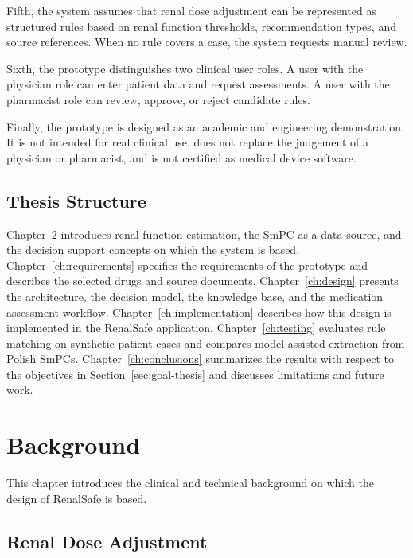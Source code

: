\documentclass[12pt,a4paper,twoside]{book}
\begin{document}
Fifth, the system assumes that renal dose adjustment can be represented as structured rules based on renal function thresholds, recommendation types, and source references.
When no rule covers a case, the system requests manual review.

Sixth, the prototype distinguishes two clinical user roles.
A user with the physician role can enter patient data and request assessments.
A user with the pharmacist role can review, approve, or reject candidate rules.

Finally, the prototype is designed as an academic and engineering demonstration.
It is not intended for real clinical use, does not replace the judgement of a physician or pharmacist, and is not certified as medical device software.

\section{Thesis Structure}\label{sec:thesis-structure}

Chapter~\ref{ch:background} introduces renal function estimation, the SmPC as a data source, and the decision support concepts on which the system is based.
Chapter~\ref{ch:requirements} specifies the requirements of the prototype and describes the selected drugs and source documents.
Chapter~\ref{ch:design} presents the architecture, the decision model, the knowledge base, and the medication assessment workflow.
Chapter~\ref{ch:implementation} describes how this design is implemented in the RenalSafe application.
Chapter~\ref{ch:testing} evaluates rule matching on synthetic patient cases and compares model-assisted extraction from Polish SmPCs.
Chapter~\ref{ch:conclusions} summarizes the results with respect to the objectives in Section~\ref{sec:goal-thesis} and discusses limitations and future work.


\chapter{Background}\label{ch:background}

This chapter introduces the clinical and technical background on which the design of RenalSafe is based.

\section{Renal Dose Adjustment}
\label{sec:renal-dose-adjustment}
\end{document}

